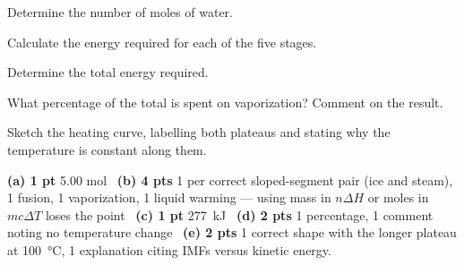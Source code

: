 \documentclass{apchem-worksheet}
\begin{document}
\begin{parts}
  \item Determine the number of moles of water.
  \item Calculate the energy required for each of the five stages.
        \workspace[4.2cm]
  \item Determine the total energy required.
  \item What percentage of the total is spent on vaporization? Comment on
        the result. 
  \item Sketch the heating curve, labelling both plateaus and stating why
        the temperature is constant along them. \workspace[4cm]
\end{parts}

\begin{apcnote}
\textbf{(a) 1 pt} 5.00 mol \textbullet\ \textbf{(b) 4 pts} 1 per correct
sloped-segment pair (ice and steam), 1 fusion, 1 vaporization, 1 liquid
warming --- using mass in $n\Delta H$ or moles in $mc\Delta T$ loses the
point \textbullet\ \textbf{(c) 1 pt} \SI{277}{\kilo\joule} \textbullet\
\textbf{(d) 2 pts} 1 percentage, 1 comment noting no temperature change
\textbullet\ \textbf{(e) 2 pts} 1 correct shape with the longer plateau at
\SI{100}{\celsius}, 1 explanation citing IMFs versus kinetic energy.
\end{apcnote}
\end{document}
